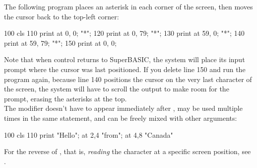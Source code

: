 \begin{entry}
{
} %

The following program places an asterisk in each corner of the screen, then moves the cursor back to the top-left corner:

\begin{lstexample}
100 cls
110 print at 0, 0; "*";
120 print at 0, 79; "*";
130 print at 59, 0; "*";
140 print at 59, 79; "*";
150 print at 0, 0;
\end{lstexample}

Note that when control returns to SuperBASIC, the system will place its input prompt where the cursor was last positioned. If you delete line 150 and run the program again, because line 140 positions the cursor on the very last character of the screen, the system will have to scroll the output to make room for the prompt, erasing the asterisks at the top.\\

The  modifier doesn't have to appear immediately after , may be used multiple times in the same statement, and can be freely mixed with other arguments:

\begin{lstexample}
100 cls
110 print "Hello"; at 2,4 "from"; at 4,8 "Canada"
\end{lstexample}

For the reverse of , that is, \emph{reading} the character at a specific screen position, see .

\end{entry}

